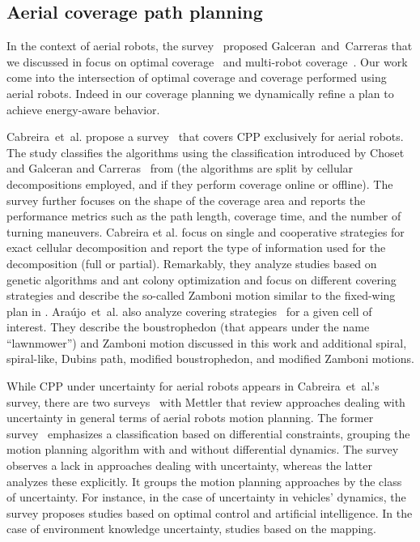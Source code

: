 \subsection{Aerial coverage path planning}
\label{sec:cov-plan-aero}

In the context of aerial robots, the survey~\citep{galceran2013survey} proposed Galceran~and~Carreras that we discussed in  focus on optimal coverage~\citep{xu2011optimal} and multi-robot coverage~\citep{ahmadzadeh2008optimization,maza2007multiple,barrientos2011aerial,araujo2013multiple}. Our work come into the intersection of optimal coverage and coverage performed using aerial robots. Indeed in our coverage planning we dynamically refine a plan to achieve energy-aware behavior.

Cabreira~et~al. propose a survey~\citep{cabreira2019survey} that covers CPP exclusively for aerial robots. The study classifies the algorithms using the classification introduced by Choset~\citep{choset2001coverage} and Galceran and Carreras~\citep{galceran2013survey} from  (the algorithms are split by cellular decompositions employed, and if they perform coverage online or offline). The survey further focuses on the shape of the coverage area and reports the performance metrics such as the path length, coverage time, and the number of turning maneuvers. Cabreira et al. focus on single and cooperative strategies for exact cellular decomposition and report the type of information used for the decomposition (full or partial). Remarkably, they analyze studies based on genetic algorithms and ant colony optimization and focus on different covering strategies and describe the so-called Zamboni motion similar to the fixed-wing plan in . 
Ara\'{u}jo~et~al. also analyze covering strategies~\citep{araujo2013multiple} for a given cell of interest. They describe the boustrophedon (that appears under the name ``lawnmower'') and Zamboni motion discussed in this work and additional spiral, spiral-like, Dubins path, modified boustrophedon, and modified Zamboni motions.

While CPP under uncertainty for aerial robots appears in Cabreira~et~al.'s survey, there are two surveys~\citep{goerzen2010survey,dadkhah2012survey} with Mettler that review approaches dealing with uncertainty in general terms of aerial robots motion planning. The former survey~\citep{goerzen2010survey} emphasizes a classification based on differential constraints, grouping the motion planning algorithm with and without differential dynamics. The survey observes a lack in approaches dealing with uncertainty, whereas the latter~\citep{dadkhah2012survey} analyzes these explicitly. It groups the motion planning approaches by the class of uncertainty. For instance, in the case of uncertainty in vehicles' dynamics, the survey proposes studies based on optimal control and artificial intelligence. In the case of environment knowledge uncertainty, studies based on the mapping.

